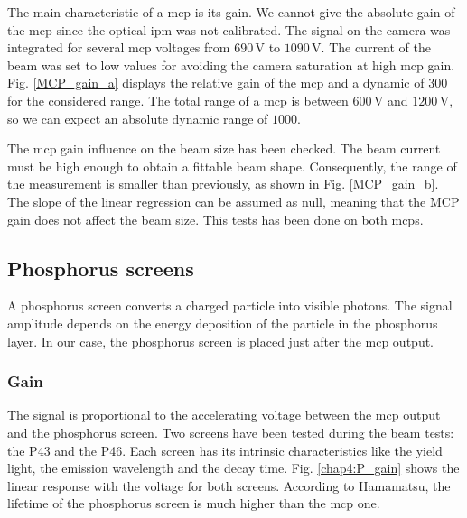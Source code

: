 \begin{refsection}
  The main characteristic of a \acrshort{mcp} is its gain. We cannot give the absolute gain of the \acrshort{mcp} since the optical \acrshort{ipm} was not calibrated. The signal on the camera was integrated for several \acrshort{mcp} voltages from $690\,\mathrm{V}$ to $1090\,\mathrm{V}$. The current of the beam was set to low values for avoiding the camera saturation at high \acrshort{mcp} gain. Fig. \ref{MCP_gain_a} displays the relative gain of the \acrshort{mcp} and a dynamic of $300$ for the considered range. The total range of a \acrshort{mcp} is between $600\,\mathrm{V}$ and $1200\,\mathrm{V}$, so we can expect an absolute dynamic range of $1000$.

  The \acrshort{mcp} gain influence on the beam size has been checked. The beam current must be high enough to obtain a fittable beam shape. Consequently, the range of the measurement is smaller than previously, as shown in Fig. \ref{MCP_gain_b}. The slope of the linear regression can be assumed as null, meaning that the MCP gain does not affect the beam size. This tests has been done on both \acrshort{mcp}s.

  

  \subsection{Phosphorus screens}

  A phosphorus screen converts a charged particle into visible photons.
  The signal amplitude depends on the energy deposition of the particle in the phosphorus layer. In our case, the phosphorus screen is placed just after the \acrshort{mcp} output.

  \subsubsection{Gain}

  The signal is proportional to the accelerating voltage between the \acrshort{mcp} output and the phosphorus screen. Two screens have been tested during the beam tests: the P43 and the P46. Each screen has its intrinsic characteristics like the yield light, the emission wavelength and the decay time. Fig. \ref{chap4:P_gain} shows the linear response with the voltage for both screens. According to Hamamatsu, the lifetime of the phosphorus screen is much higher than the \acrshort{mcp} one.

  


\end{refsection}
